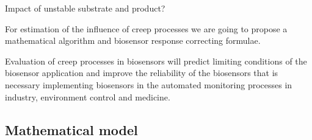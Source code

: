 \documentclass[hyperref={breaklinks=true},fleqn,mathserif]{beamer}
\begin{document}
\begin{frame}[shrink=11]{Impact of unstable substrate and product?}


\pause
\begin{block}{}
For estimation of the influence of creep processes we are going to propose a mathematical algorithm and biosensor response correcting formulae.

\smallskip
Evaluation of creep processes in biosensors will predict limiting conditions of the biosensor application and improve the reliability of the biosensors
that is necessary implementing biosensors in the automated monitoring processes in industry, environment control and medicine.
\end{block}

\end{frame}

\subsection{Mathematical model}
\end{document}
